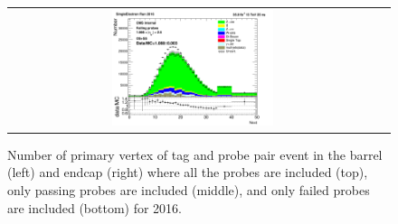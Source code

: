 \begin{figure}[htp]
\begin{center}
\begin{tabular}{cc}
      \includegraphics[width=0.45\textwidth]{figures/Zprime/2016/ScaleFactor/SameSign/nominal/stack_nVtx_Endcap_fail_PUW.png}
    \end{tabular}
    \caption{Number of primary vertex of tag and probe pair event in the barrel (left) and endcap (right) where all the probes are included (top), only passing probes are included (middle), and only failed probes are included (bottom) for 2016.}
    \label{fig:SS_nominal_PV_2016}
  \end{center}
\end{figure}



